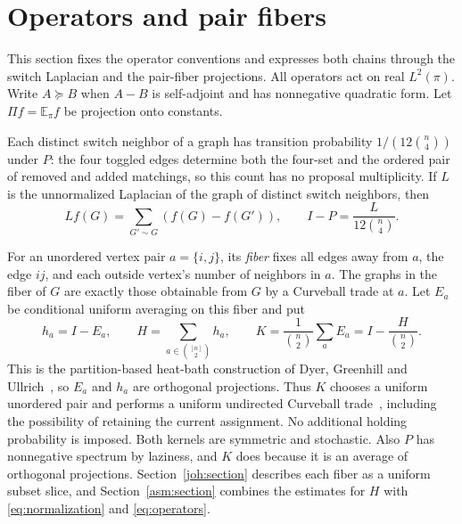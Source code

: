 \section{Operators and pair fibers}\label{sec:setup}
This section fixes the operator conventions and expresses both chains through
the switch Laplacian and the pair-fiber projections. All operators act on
real $L^2(\pi)$. Write $A\succeq B$ when $A-B$ is self-adjoint and has
nonnegative quadratic form. Let $\Pi f=\mathbb E_\pi f$ be projection onto
constants.

Each distinct switch neighbor of a graph has transition probability
$1/(12\binom n4)$ under $P$: the four toggled edges determine both the
four-set and the ordered pair of removed and added matchings, so this count
has no proposal multiplicity. If $L$ is the unnormalized Laplacian of the
graph of distinct switch neighbors, then
\begin{equation}\label{eq:normalization}
 Lf(G)=\sum_{G'\sim G}(f(G)-f(G')),\qquad I-P=\frac{L}{12\binom n4}.
\end{equation}

For an unordered vertex pair $a=\{i,j\}$, its \emph{fiber} fixes all edges
away from $a$, the edge $ij$, and each outside vertex's number of neighbors
in $a$. The graphs in the fiber of $G$ are exactly those obtainable from $G$
by a Curveball trade at $a$. Let $E_a$ be conditional uniform averaging on
this fiber and put
\begin{equation}\label{eq:operators}
 h_a=I-E_a,\qquad H=\sum_{a\in\binom{[n]}2}h_a,\qquad
 K=\frac{1}{\binom n2}\sum_a E_a=I-\frac{H}{\binom n2}.
\end{equation}
This is the partition-based heat-bath construction of Dyer, Greenhill and
Ullrich~\cite[Definition~1.1]{DGU14}, so $E_a$ and $h_a$ are orthogonal
projections. Thus $K$ chooses a uniform unordered pair and performs a uniform
undirected Curveball trade~\cite{CBS18}, including the possibility of
retaining the current assignment. No additional holding probability is
imposed. Both kernels are symmetric and stochastic. Also $P$ has nonnegative spectrum by
laziness, and $K$ does because it is an average of orthogonal projections.
Section~\ref{joh:section} describes each fiber as a uniform subset slice, and
Section~\ref{asm:section} combines the estimates for $H$ with
\eqref{eq:normalization} and \eqref{eq:operators}.
